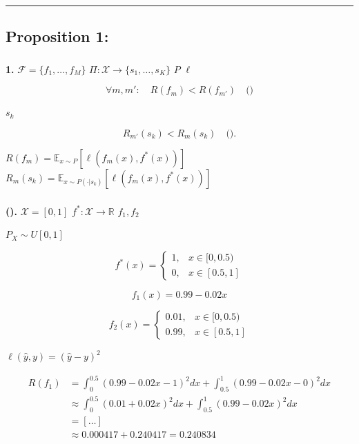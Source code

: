 \documentclass[
  12pt,
]{article}
\begin{document}
\begin{center}\rule{0.5\linewidth}{0.5pt}\end{center}

\subsection{Proposition 1:
}\label{proposition-1-ux5168ux5c40ux4e13ux5bb6ux6392ux5e8fux4e0dux8db3}

\subsubsection{}\label{ux6570ux5b66ux9648ux8ff0}

\textbf{ 1.}  \(\mathcal{F} = \{f_1, \dots, f_M\}\)
\(\Pi: \mathcal{X} \to \{s_1, \dots, s_K\}\)
 \(P\) 
\(\ell\)

\[\forall m, m': \quad R(f_m) < R(f_{m'}) \quad \text{()}\]

 \(s_k\) 

\[R_{m'}(s_k) < R_m(s_k) \quad \text{()}.\]

 \(R(f_m) = \mathbb{E}_{x \sim P}[\ell(f_m(x), f^*(x))]\)
\(R_m(s_k) = \mathbb{E}_{x \sim P(\cdot|s_k)}[\ell(f_m(x), f^*(x))]\)


\subsubsection{}\label{ux8bc1ux660e}

\textbf{ ().}  \(\mathcal{X} = [0, 1]\)
\(f^*: \mathcal{X} \to \mathbb{R}\) \(f_1, f_2\)

\(P_X \sim U[0, 1]\)



\[f^*(x) = \begin{cases} 
1, & x \in [0, 0.5) \\
0, & x \in [0.5, 1]
\end{cases}\]

\[f_1(x) = 0.99 - 0.02x\]

\[f_2(x) = \begin{cases}
0.01, & x \in [0, 0.5) \\
0.99, & x \in [0.5, 1]
\end{cases}\]

 \(\ell(\hat{y}, y) = (\hat{y} - y)^2\)

\textbf{} \[\begin{aligned}
R(f_1) &= \int_0^{0.5} (0.99 - 0.02x - 1)^2 dx + \int_{0.5}^1 (0.99 - 0.02x - 0)^2 dx \\
&\approx \int_0^{0.5} (0.01 + 0.02x)^2 dx + \int_{0.5}^1 (0.99 - 0.02x)^2 dx \\
&= [\dots] \\
&\approx 0.000417 + 0.240417 = 0.240834
\end{aligned}\]
\end{document}
